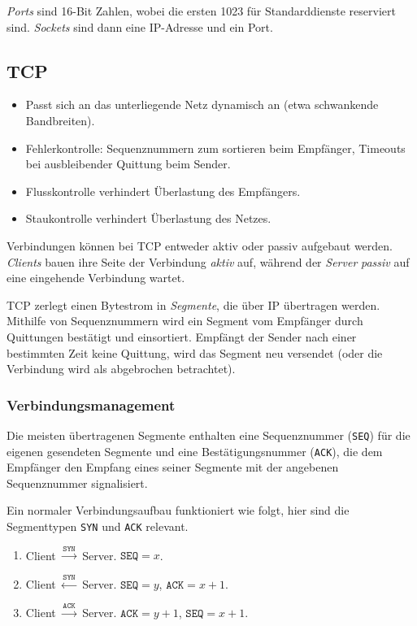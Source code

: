 \documentclass[a4paper,parskip=half*,DIV=15,fontsize=11pt]{scrartcl}
\begin{document}
\emph{Ports} sind 16-Bit Zahlen, wobei die ersten 1023 für Standarddienste reserviert sind. \emph{Sockets} sind dann eine IP-Adresse und ein Port.

\subsection{TCP}

\begin{itemize}
\item Passt sich an das unterliegende Netz dynamisch an (etwa schwankende Bandbreiten).
\item Fehlerkontrolle: Sequenznummern zum sortieren beim Empfänger, Timeouts bei ausbleibender Quittung beim Sender.
\item Flusskontrolle verhindert Überlastung des Empfängers.
\item Staukontrolle verhindert Überlastung des Netzes.
\end{itemize}

Verbindungen können bei TCP entweder aktiv oder passiv aufgebaut werden. \emph{Clients} bauen ihre Seite der Verbindung \emph{aktiv} auf, während der \emph{Server} \emph{passiv} auf eine eingehende Verbindung wartet.

TCP zerlegt einen Bytestrom in \emph{Segmente}, die über IP übertragen werden. Mithilfe von Sequenznummern wird ein Segment vom Empfänger durch Quittungen bestätigt und einsortiert. Empfängt der Sender nach einer bestimmten Zeit keine Quittung, wird das Segment neu versendet (oder die Verbindung wird als abgebrochen betrachtet).

\subsubsection{Verbindungsmanagement}

Die meisten übertragenen Segmente enthalten eine Sequenznummer (\lstinline{SEQ}) für die eigenen gesendeten Segmente und eine Bestätigungsnummer (\lstinline{ACK}), die dem Empfänger den Empfang eines seiner Segmente mit der angebenen Sequenznummer signalisiert.

Ein normaler Verbindungsaufbau funktioniert wie folgt, hier sind die Segmenttypen \lstinline{SYN} und \lstinline{ACK} relevant.

\begin{enumerate}
\item Client $\stackrel{\texttt{SYN}}{\to}$ Server. $\texttt{SEQ} = x$.
\item Client $\stackrel{\texttt{SYN}}{\leftarrow}$ Server. $\texttt{SEQ} = y$, $\texttt{ACK} = x + 1$.
\item Client $\stackrel{\texttt{ACK}}{\to}$ Server. $\texttt{ACK} = y + 1$, $\texttt{SEQ} = x + 1$.
\end{enumerate}
\end{document}
